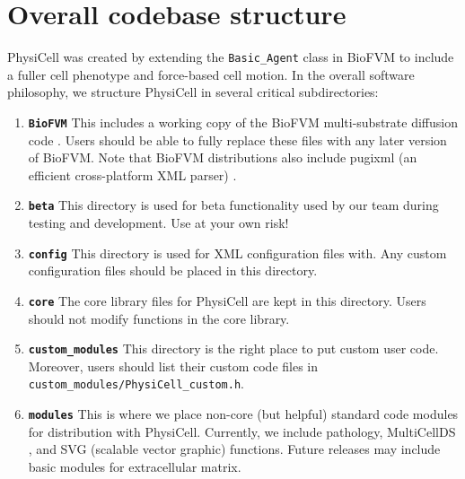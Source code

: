 \documentclass[12pt]{article}
\renewcommand{\v}{\verb}
\newcommand{\smallcode}[1]{\textbf{\texttt{#1}}}
\newcommand{\blue}[1]{\textcolor{blue}{#1}}
\newcommand{\DONE}{}%
\begin{document}
\section{Overall codebase structure \DONE}
PhysiCell was created by extending the \v|Basic_Agent| class in BioFVM \cite{ref:BioFVM} to include a fuller cell phenotype 
and force-based cell motion. In the overall software philosophy, we structure PhysiCell in several critical 
subdirectories: 
\begin{enumerate}
\item 
\smallcode{BioFVM} This includes a working copy of the BioFVM multi-substrate diffusion code \cite{ref:BioFVM}. Users should be able 
to fully replace these files with any later version of BioFVM. Note that BioFVM distributions also include 
pugixml (an efficient cross-platform XML parser) \cite{ref:pugixml}. 
\item 
\smallcode{beta} This directory is used for beta functionality used by our team during 
testing and development. Use at your own risk! 
\item 
\smallcode{config} This directory is used for XML configuration files with. Any custom configuration files should be placed in this directory. 
\item 
\smallcode{core} The core library files for PhysiCell are kept in this directory. Users should not modify functions in 
the core library. 
\item 
\smallcode{custom\_modules} This directory is the right place to put custom user code. Moreover, users should 
list their custom code files in \v|custom_modules/PhysiCell_custom.h|. 

\item 
\smallcode{modules} This is where we place non-core (but helpful) standard code modules for distribution with PhysiCell. 
Currently, we include pathology, MultiCellDS \cite{ref:MultiCellDS}, and SVG (scalable vector graphic) functions. 
Future releases may include basic modules for extracellular matrix. 
\end{enumerate}
\end{document}
